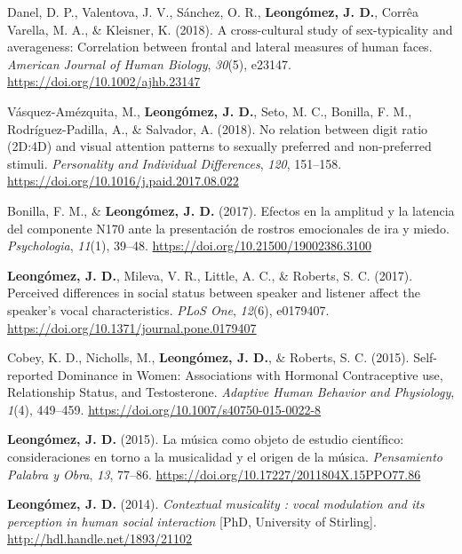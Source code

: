 \documentclass[11pt,a4paper,]{awesome-cv}
\begin{document}
\leavevmode{}%
Danel, D. P., Valentova, J. V., Sánchez, O. R.,
\textbf{Leongómez, J. D.}, Corrêa Varella, M. A., \& Kleisner, K.
(2018). {A cross-cultural study of sex-typicality and averageness:
Correlation between frontal and lateral measures of human faces}.
\emph{American Journal of Human Biology}, \emph{30}(5), e23147.
\url{https://doi.org/10.1002/ajhb.23147}

\leavevmode{}%
Vásquez-Amézquita, M., \textbf{Leongómez, J. D.}, Seto, M. C., Bonilla,
F. M., Rodríguez-Padilla, A., \& Salvador, A. (2018). {No relation
between digit ratio (2D:4D) and visual attention patterns to sexually
preferred and non-preferred stimuli}. \emph{Personality and Individual
Differences}, \emph{120}, 151--158.
\url{https://doi.org/10.1016/j.paid.2017.08.022}

\leavevmode{}%
Bonilla, F. M., \& \textbf{Leongómez, J. D.} (2017). {Efectos en la
amplitud y la latencia del componente N170 ante la presentaci{ó}n de
rostros emocionales de ira y miedo}. \emph{Psychologia}, \emph{11}(1),
39--48. \url{https://doi.org/10.21500/19002386.3100}

\leavevmode{}%
\textbf{Leongómez, J. D.}, Mileva, V. R., Little, A. C., \& Roberts, S.
C. (2017). {Perceived differences in social status between speaker and
listener affect the speaker's vocal characteristics}. \emph{PLoS One},
\emph{12}(6), e0179407.
\url{https://doi.org/10.1371/journal.pone.0179407}

\leavevmode{}%
Cobey, K. D., Nicholls, M., \textbf{Leongómez, J. D.}, \& Roberts, S. C.
(2015). {Self-reported Dominance in Women: Associations with Hormonal
Contraceptive use, Relationship Status, and Testosterone}.
\emph{Adaptive Human Behavior and Physiology}, \emph{1}(4), 449--459.
\url{https://doi.org/10.1007/s40750-015-0022-8}

\leavevmode{}%
\textbf{Leongómez, J. D.} (2015). {La m{ú}sica como objeto de estudio
cient{í}fico: consideraciones en torno a la musicalidad y el origen de
la m{ú}sica}. \emph{Pensamiento Palabra y Obra}, \emph{13}, 77--86.
\url{https://doi.org/10.17227/2011804X.15PPO77.86}

\leavevmode{}%
\textbf{Leongómez, J. D.} (2014). \emph{{Contextual musicality : vocal
modulation and its perception in human social interaction}} {[}PhD,
University of Stirling{]}. \url{http://hdl.handle.net/1893/21102}
\end{document}

